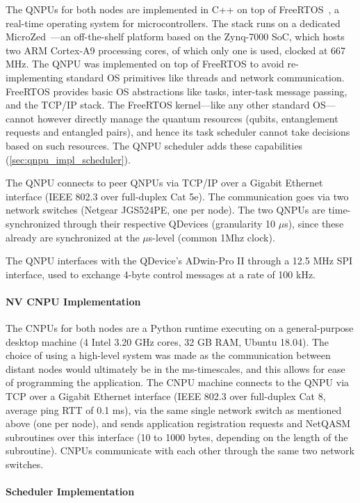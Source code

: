 The QNPUs for both nodes are implemented in C++ on top of FreeRTOS~\cite{freertos}, a real-time operating system for microcontrollers. The stack runs on a dedicated MicroZed~\cite{microzed}---an off-the-shelf platform based on the Zynq-7000 SoC, which hosts two ARM Cortex-A9 processing cores, of which only one is used, clocked at 667 MHz. The QNPU was implemented on top of FreeRTOS to avoid re-implementing standard OS primitives like threads and network communication. FreeRTOS provides basic OS abstractions like tasks, inter-task message passing, and the TCP/IP stack. The FreeRTOS kernel---like any other standard OS---cannot however directly manage the quantum resources (qubits, entanglement requests and entangled pairs), and hence its task scheduler cannot take decisions based on such resources. The QNPU scheduler adds these capabilities (\cref{sec:qnpu_impl_scheduler}).

The QNPU connects to peer QNPUs via TCP/IP over a Gigabit Ethernet interface (IEEE 802.3 over full-duplex Cat 5e). The communication goes via two network switches (Netgear JGS524PE, one per node). The two QNPUs are time-synchronized through their respective QDevices (granularity 10 $\mu$s), since these already are synchronized at the $\mu$s-level (common 1Mhz clock).

The QNPU interfaces with the QDevice's ADwin-Pro II through a 12.5 MHz SPI interface, used to exchange 4-byte control messages at a rate of 100 kHz.  

\paragraph{NV CNPU Implementation}

The CNPUs for both nodes are a Python runtime executing on a general-purpose desktop machine (4 Intel 3.20 GHz cores, 32 GB RAM, Ubuntu 18.04). The choice of using a high-level system was made as the communication between distant nodes would ultimately be in the ms-timescales, and this allows for ease of programming the application. The CNPU machine connects to the QNPU via TCP over a Gigabit Ethernet interface (IEEE 802.3 over full-duplex Cat 8, average ping RTT of 0.1 ms), via the same single network switch as mentioned above (one per node), and sends application registration requests and NetQASM subroutines over this interface (10 to 1000 bytes, depending on the length of the subroutine). CNPUs communicate with each other through the same two network switches.

\paragraph{Scheduler Implementation}

